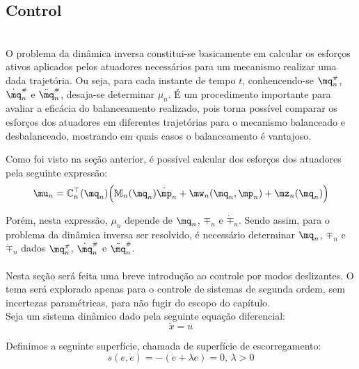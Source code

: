 \subsection{Control}\label{S03-2}

\\

O problema da din\^amica inversa constitui-se basicamente em calcular os esfor\c{c}os ativos aplicados pelos atuadores necess\'arios para um mecanismo realizar uma dada trajet\'oria. Ou seja, para cada instante de tempo $t$, conhencendo-se $\mq_n\ssh$, $\dot{\mq}_n\ssh$ e $\ddot{\mq}_n\ssh$, desaja-se determinar $\mu_n$. \'E um procedimento importante para avaliar a efic\'acia do balanceamento realizado, pois torna poss\'ivel comparar os esfor\c{c}os dos atuadores em diferentes trajet\'orias para o mecanismo balanceado e desbalanceado, mostrando em quais casos o balanceamento \'e vantajoso.

Como foi visto na se\c{c}\~ao anterior, \'e poss\'ivel calcular dos esfor\c{c}os dos atuadores pela seguinte express\~ao:
\begin{equation} \label{eq:InverseDynamics}
\mu_n = \mC_n^\top(\mq_n) \Big( \mM_n(\mq_n) \dot{\mp}_n + \mw_n(\mq_n, \mp_n) + \mz_n(\mq_n) \Big)
\end{equation}

Por\'em, nesta express\~ao, $\mu_n$ depende de $\mq_n$, $\mp_n$ e $\dot{\mp}_n$. Sendo assim, para o problema da din\^amica inversa ser resolvido, \'e necess\'ario determinar $\mq_n$, $\mp_n$ e $\dot{\mp}_n$ dados $\mq_n\ssh$, $\dot{\mq}_n\ssh$ e $\ddot{\mq}_n\ssh$.  \\
 
\\

Nesta se\c{c}\~ao ser\'a feita uma breve introdu\c{c}\~ao ao controle por modos deslizantes. O tema ser\'a explorado apenas para o controle de sistemas de segunda ordem, sem incertezas param\'etricas, para n\~ao fugir do escopo do cap\'itulo. \\

Seja um sistema din\^amico dado pela seguinte equa\c{c}\~ao diferencial:
\begin{equation} \label{eq:SimpleODE}
\ddot{x} = u
\end{equation}

Definimos a seguinte superf\'icie, chamada de superf\'icie de escorregamento:
\begin{equation} \label{eq:SlidingSurface}
s(e, \dot{e}) = - (\dot{e} + \lambda e) = 0, \, \lambda > 0
\end{equation}

